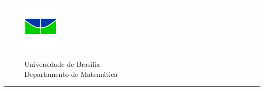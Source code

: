 \pagestyle{empty}

\begin{figure}[h]
        \begin{minipage}[c]{1.7cm}
        \includegraphics[width=1.7cm]{unb.pdf}
        \end{minipage}%
        \hspace{0pt}
        \begin{minipage}[c]{4in}
          {Universidade de Brasília} \\
          {Departamento de Matemática}
\end{minipage}
\end{figure}
\vspace{-1cm}\hrule
